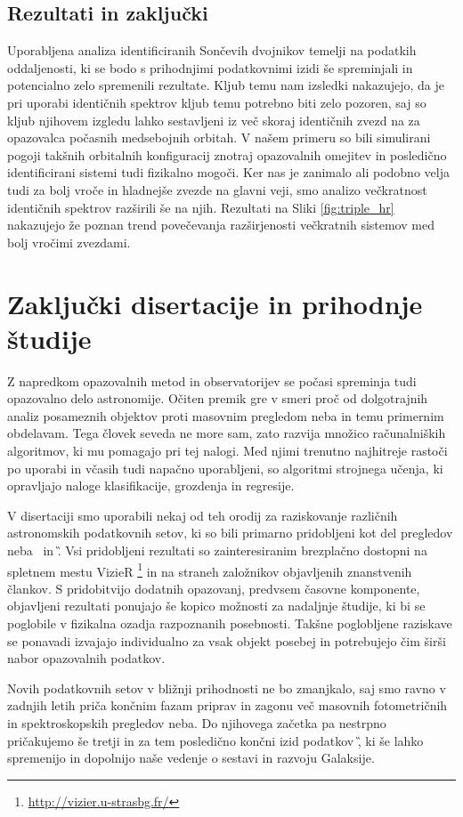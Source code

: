 \subsection{Rezultati in zaključki}
Uporabljena analiza identificiranih Sončevih dvojnikov temelji na podatkih oddaljenosti, ki se bodo s prihodnjimi podatkovnimi izidi še spreminjali in potencialno zelo spremenili rezultate. Kljub temu nam izsledki nakazujejo, da je pri uporabi identičnih spektrov kljub temu potrebno biti zelo pozoren, saj so kljub njihovem izgledu lahko sestavljeni iz več skoraj identičnih zvezd na za opazovalca počasnih medsebojnih orbitah. V našem primeru so bili simulirani pogoji takšnih orbitalnih konfiguracij znotraj opazovalnih omejitev in posledično identificirani sistemi tudi fizikalno mogoči. Ker nas je zanimalo ali podobno velja tudi za bolj vroče in hladnejše zvezde na glavni veji, smo analizo večkratnost identičnih spektrov razširili še na njih. Rezultati na Sliki \ref{fig:triple_hr} nakazujejo že poznan trend \cite{2013ARA&A..51..269D} povečevanja razširjenosti večkratnih sistemov med bolj vročimi zvezdami.

\section{Zaključki disertacije in prihodnje študije}
\label{sec:slo_zakljucek}
Z napredkom opazovalnih metod in observatorijev se počasi spreminja tudi opazovalno delo astronomije. Očiten premik gre v smeri proč od dolgotrajnih analiz posameznih objektov proti masovnim pregledom neba in temu primernim obdelavam. Tega človek seveda ne more sam, zato razvija množico računalniških algoritmov, ki mu pomagajo pri tej nalogi. Med njimi trenutno najhitreje rastoči po uporabi in včasih tudi napačno uporabljeni, so algoritmi strojnega učenja, ki opravljajo naloge klasifikacije, grozdenja in regresije.

V disertaciji smo uporabili nekaj od teh orodij za raziskovanje različnih astronomskih podatkovnih setov, ki so bili primarno pridobljeni kot del pregledov neba \Gh\ in \G. Vsi pridobljeni rezultati so zainteresiranim brezplačno dostopni na spletnem mestu VizieR \footnote{\url{http://vizier.u-strasbg.fr/}} in na straneh založnikov objavljenih znanstvenih člankov. S pridobitvijo dodatnih opazovanj, predvsem časovne komponente, objavljeni rezultati ponujajo še kopico možnosti za nadaljnje študije, ki bi se poglobile v fizikalna ozadja razpoznanih posebnosti. Takšne poglobljene raziskave se ponavadi izvajajo individualno za vsak objekt posebej in potrebujejo čim širši nabor opazovalnih podatkov.

Novih podatkovnih setov v bližnji prihodnosti ne bo zmanjkalo, saj smo ravno v zadnjih letih priča končnim fazam priprav in zagonu več masovnih fotometričnih in spektroskopskih pregledov neba. Do njihovega začetka pa nestrpno pričakujemo še tretji in za tem posledično končni izid podatkov \G, ki še lahko spremenijo in dopolnijo naše vedenje o sestavi in razvoju Galaksije.